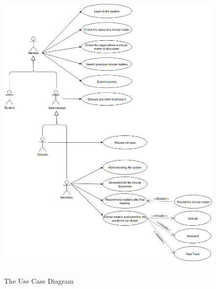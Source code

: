 \documentclass[a4paper,beamer]{article}
\begin{document}
	\begin{figure}[h]
		\begin{center}
			\includegraphics[width=6in,height=6in]{img/use-case-diagram}
		\end{center}
		\caption{The Use Case Diagram}
		\label{fig:usecase}
	\end{figure}
	\newpage        
	
\end{document}
